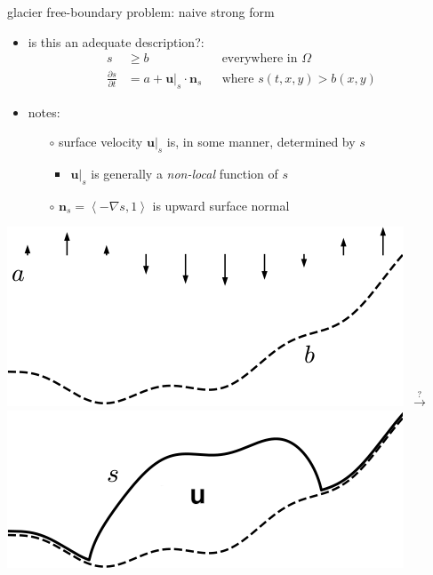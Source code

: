 \documentclass[svgnames,
               hyperref={colorlinks,citecolor=DeepPink4,linkcolor=FireBrick,urlcolor=Maroon},
               usepdftitle=false]  %
               {beamer}
\newcommand{\grad}{\nabla}
\newcommand{\bn}{\mathbf{n}}
\newcommand{\bu}{\mathbf{u}}
\begin{document}
\begin{frame}{glacier free-boundary problem: naive strong form}

\begin{itemize}
\item is this an adequate description?:
\begin{align*}
s &\ge b                    & &\text{everywhere in } \Omega \\
\frac{\partial s}{\partial t} &= a + \bu|_s \cdot \bn_s & &\text{where } s(t,x,y) > b(x,y)
\end{align*}
\item notes:
    \begin{itemize}
    \item[$\circ$] surface velocity $\bu|_s$ is, \alert{in some manner}, determined by $s$
        \begin{itemize}
        \item $\bu|_s$ is generally a \emph{non-local} function of $s$
        \end{itemize}
    \item[$\circ$] $\bn_s=\left<-\grad s,1\right>$ is upward surface normal
    \end{itemize}
\end{itemize}

\bigskip
\hfill \mbox{\includegraphics[height=0.2\textheight]{../talk-oxford/images/domain-data.png} \quad $\stackrel{?}{\to}$ \quad \includegraphics[height=0.2\textheight]{../talk-oxford/images/domain-velocity.png}}
\end{frame}
\end{document}
